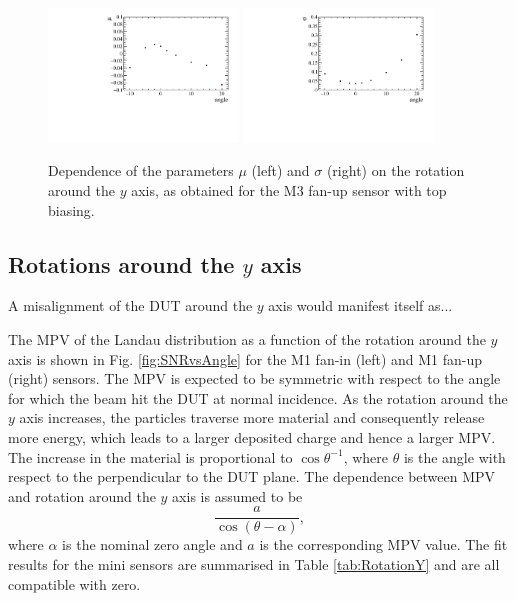 \begin{figure}[]
\centering
\includegraphics[width=0.45\textwidth]{figs/ChargeSharingvsAngle/cmuvsAngle_M3_FanUp_Top.pdf}
\includegraphics[width=0.45\textwidth]{figs/ChargeSharingvsAngle/csigmavsAngle_M3_FanUp_Top.pdf}
\caption[Dependence of the parameters $\mu$ and $\sigma$ on the rotation around the $y$ axis.]{Dependence of the parameters $\mu$ (left) and $\sigma$ (right) on the rotation around the $y$ axis, as obtained for the M3 fan-up sensor with top biasing.}
\label{fig:ChargeSharingvsAngle2}
\end{figure}

\subsection{Rotations around the $y$ axis}

A misalignment of the DUT around the $y$ axis would manifest itself as...

The MPV of the Landau distribution as a function of the rotation around the $y$ axis is shown in Fig. \ref{fig:SNRvsAngle} for the M1 fan-in (left) and M1 fan-up (right) sensors.
The MPV is expected to be symmetric with respect to the angle for which the beam hit the DUT at normal incidence.
As the rotation around the $y$ axis increases, the particles traverse more material and consequently release more energy, which leads to a larger deposited charge and hence a larger MPV. The increase in the material is proportional to $\cos\theta^{-1}$, where $\theta$ is the angle with respect to the perpendicular to the DUT plane.
The dependence between MPV and rotation around the $y$ axis is assumed to be
\begin{displaymath}
\frac{a}{\cos(\theta-\alpha)},
\end{displaymath}
where $\alpha$ is the nominal zero angle and $a$ is the corresponding MPV value. 
The fit results for the mini sensors are summarised in Table \ref{tab:RotationY} and are all compatible with zero.

